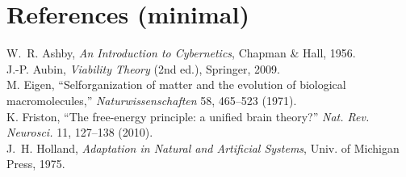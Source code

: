\documentclass[a4paper,11pt]{article}
\begin{document}
\section*{References (minimal)}
W.~R. Ashby, \emph{An Introduction to Cybernetics}, Chapman \& Hall, 1956.\\
J.-P. Aubin, \emph{Viability Theory} (2nd ed.), Springer, 2009.\\
M. Eigen, ``Selforganization of matter and the evolution of biological macromolecules,'' \emph{Naturwissenschaften} 58, 465--523 (1971).\\
K. Friston, ``The free-energy principle: a unified brain theory?'' \emph{Nat. Rev. Neurosci.} 11, 127--138 (2010).\\
J.~H. Holland, \emph{Adaptation in Natural and Artificial Systems}, Univ. of Michigan Press, 1975.
\end{document}
